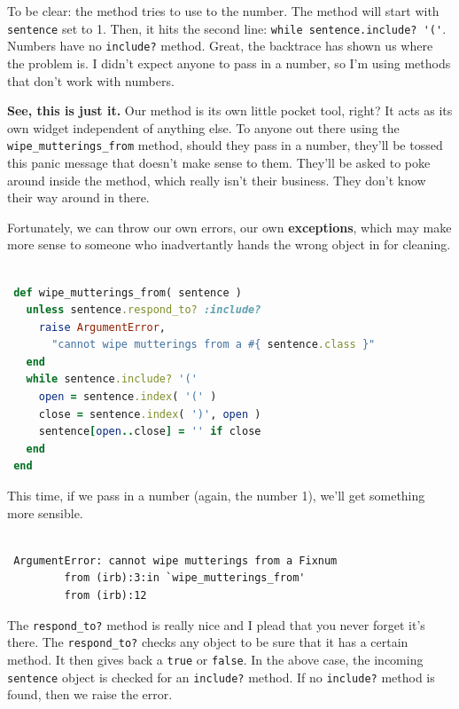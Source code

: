\documentclass[10pt,twoside]{report}
\begin{document}
To be clear: the method tries to use to the number.  The method will
start with \lstinline[breaklines=true]|sentence| set to 1. Then, it
hits the second line: 
\lstinline[breaklines=true]|while sentence.include? '('|.  
Numbers have no \lstinline[breaklines=true]|include?| method.  Great,
the backtrace has shown us where the problem is.  I didn't expect
anyone to pass in a number, so I'm using methods that don't work with
numbers.

{\bf See, this is just it.}  Our method is its own little pocket tool,
right?  It acts as its own widget independent of anything else.  To
anyone out there using the
\lstinline[breaklines=true]|wipe_mutterings_from| method, should they
pass in a number, they'll be tossed this panic message that doesn't
make sense to them.  They'll be asked to poke around inside the
method, which really isn't their business.  They don't know their way
around in there.

Fortunately, we can throw our own errors, our own {\bf exceptions},
which may make more sense to someone who inadvertantly hands the wrong
object in for cleaning.


\begin{lstlisting}[basicstyle=\ttfamily\color{basiccolor},
    commentstyle = \ttfamily\color{commentcolor},
    keywordstyle=\ttfamily\color{keywordscolor},
    stringstyle=\color{stringcolor},
    language=Ruby,
    basicstyle=\small\ttfamily,
    showstringspaces=false,
  ]

 def wipe_mutterings_from( sentence )
   unless sentence.respond_to? :include?
     raise ArgumentError,
       "cannot wipe mutterings from a #{ sentence.class }"
   end
   while sentence.include? '('
     open = sentence.index( '(' )
     close = sentence.index( ')', open )
     sentence[open..close] = '' if close
   end
 end

\end{lstlisting}


This time, if we pass in a number (again, the number 1), we'll get
something more sensible.


\begin{lstlisting}

 ArgumentError: cannot wipe mutterings from a Fixnum
         from (irb):3:in `wipe_mutterings_from'
         from (irb):12

\end{lstlisting}


The \lstinline[breaklines=true]|respond_to?| method is really nice and
I plead that you never forget it's there.  The
\lstinline[breaklines=true]|respond_to?| checks any object to be sure
that it has a certain method.  It then gives back a
\lstinline[breaklines=true]|true| or
\lstinline[breaklines=true]|false|.  In the above case, the incoming
\lstinline[breaklines=true]|sentence| object is checked for an
\lstinline[breaklines=true]|include?| method.  If no
\lstinline[breaklines=true]|include?| method is found, then we raise
the error.
\end{document}
